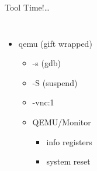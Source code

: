 \begin{frame}{Tool Time!\ldots}
    \begin{columns}
	        \begin{itemize}
		        \item qemu (gift wrapped)
                 {
                	\begin{itemize}
                		\item -s (gdb)
            	    	\item -S (suspend)
        	        	\item -vnc:1
	                \end{itemize}
                }
                 {
                	\begin{itemize}
               			\item QEMU/Monitor
                		\begin{itemize}
	    	            	\item info registers
    	    	        	\item system reset
    	    	        \end{itemize}
        	    	\end{itemize}
        	    }
       	    \end{itemize}
    \end{columns}
\end{frame}